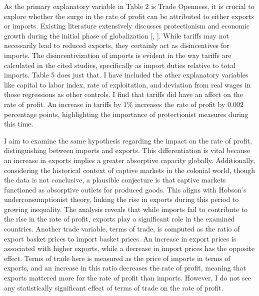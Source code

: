 \documentclass[10pt]{article}
\begin{document}
\par As the primary explanatory variable in Table 2 is Trade Openness, it is crucial to explore whether the surge in the rate of profit can be attributed to either exports or imports. Existing literature extensively discusses protectionism and economic growth during the initial phase of globalization [\citep{ORourke2000tariffs}, \citep{schularick2011tariffs}]. While tariffs may not necessarily lead to reduced exports, they certainly act as disincentives for imports. The disincentivization of imports is evident in the way tariffs are calculated in the cited studies, specifically as import duties relative to total imports. Table 5 does just that. I have included the other explanatory variables like capital to labor index, rate of exploitation, and deviation from real wages in those regressions as other controls. I find that tariffs did have an affect on the rate of profit. An increase in tariffs by 1\% increases the rate of profit by 0.002 percentage points, highlighting the importance of protectionist measures during this time. 

\par I aim to examine the same hypothesis regarding the impact on the rate of profit, distinguishing between imports and exports. This differentiation is vital because an increase in exports implies a greater absorptive capacity globally. Additionally, considering the historical context of captive markets in the colonial world, though the data is not conclusive, a plausible conjecture is that captive markets functioned as absorptive outlets for produced goods. This aligns with Hobson's underconsumptionist theory, linking the rise in exports during this period to growing inequality. The analysis reveals that while imports fail to contribute to the rise in the rate of profit, exports play a significant role in the examined countries. Another trade variable, terms of trade, is computed as the ratio of export basket prices to import basket prices. An increase in export prices is associated with higher exports, while a decrease in import prices has the opposite effect. Terms of trade here is measured as the price of imports in terms of exports, and an increase in this ratio decreases the rate of profit, meaning that exports mattered more for the rate of profit than imports. However, I do not see any statistically significant effect of terms of trade on the rate of profit. 
\end{document}
